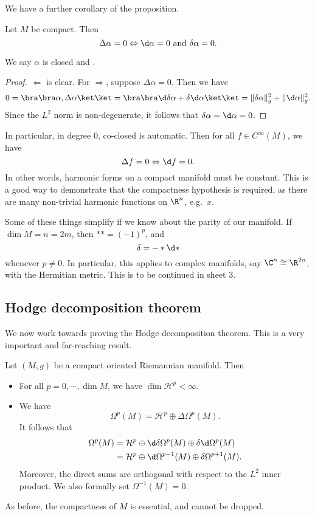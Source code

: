 \documentclass[a4paper]{article}
\begin{document}
We have a further corollary of the proposition.
\begin{cor}
  Let $M$ be compact. Then
  \[
    \Delta \alpha = 0 \Leftrightarrow \d \alpha = 0\text{ and }\delta \alpha = 0.
  \]
\end{cor}
We say $\alpha$ is closed and .

\begin{proof}
  $\Leftarrow$ is clear. For $\Rightarrow$, suppose $\Delta \alpha = 0$. Then we have
  \[
    0 = \bra\bra \alpha, \Delta \alpha\ket\ket = \bra\bra \d \delta \alpha + \delta \d \alpha\ket\ket = \|\delta \alpha\|_g^2 + \|\d \alpha\|_g^2.
  \]
  Since the $L^2$ norm is non-degenerate, it follows that $\delta \alpha = \d \alpha = 0$.
\end{proof}

In particular, in degree $0$, co-closed is automatic. Then for all $f \in C^\infty(M)$, we have
\[
  \Delta f = 0 \Leftrightarrow \d f = 0.
\]
In other words, harmonic forms on a compact manifold must be constant. This is a good way to demonstrate that the compactness hypothesis is required, as there are many non-trivial harmonic functions on $\R^n$, e.g.\ $x$.

Some of these things simplify if we know about the parity of our manifold. If $\dim M = n = 2m$, then $** = (-1)^p$, and
\[
  \delta = - * \d *
\]
whenever $p \not= 0$. In particular, this applies to complex manifolds, say $\C^n \cong \R^{2n}$, with the Hermitian metric. This is to be continued in sheet 3.

\subsection{Hodge decomposition theorem}
We now work towards proving the Hodge decomposition theorem. This is a very important and far-reaching result.

\begin{thm}
  Let $(M, g)$ be a compact oriented Riemannian manifold. Then
  \begin{itemize}
    \item For all $p = 0, \cdots, \dim M$, we have $\dim \mathcal{H}^p < \infty$.
    \item We have
      \[
        \Omega^p(M) = \mathcal{H}^p \oplus \Delta \Omega^p(M).
      \]
      It follows that
      \begin{align*}
        \Omega^p(M) &= \mathcal{H}^p \oplus \d \delta \Omega^p(M) \oplus \delta \d \Omega^p(M)\\
        &= \mathcal{H}^p \oplus \d \Omega^{p - 1}(M) \oplus \delta \Omega^{p + 1}(M).
      \end{align*}
      Moreover, the direct sums are orthogonal with respect to the $L^2$ inner product. We also formally set $\Omega^{-1}(M) = 0$.
  \end{itemize}
\end{thm}
As before, the compactness of $M$ is essential, and cannot be dropped.
\end{document}
